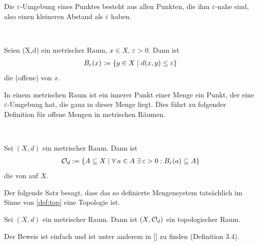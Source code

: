     Die
    $\varepsilon$-Umgebung eines Punktes besteht aus allen Punkten, die ihm $\varepsilon$-nahe sind, also einen kleineren Abstand als $\varepsilon$ haben.
    \begin{dfn}\label{def:eps-umg}\ \vspace{8pt}

        \noindent
        Seien (X,d) ein metrischer Raum, $x \in X$, $\varepsilon > 0$. Dann ist
        \begin{align*}
            B_\varepsilon(x) := \{y \in X \mid d(x,y) \leq \varepsilon \}
        \end{align*}
        die (offene)  von $x$.
        
    \end{dfn}


    In
    einem metrischen Raum ist ein innerer Punkt einer Menge ein Punkt, der eine $\varepsilon$-Umgebung hat, die ganz in dieser Menge liegt. Dies führt zu folgender Definition für offene Mengen in metrischen Räumen.
    \begin{dfn} \label{def:topMet} \ \vspace{8pt}

        \noindent
        Sei $(X,d)$ ein metrischer Raum. Dann ist
        \begin{align*}
            \mathcal{O}_d := \{A \subseteq X \mid \forall\: a \in A \; \exists\: \varepsilon > 0: B_\varepsilon(a) \subseteq A \}
        \end{align*}
        die von  auf $X$.
        
    \end{dfn}

    Der folgende Satz besagt, dass das so definierte Mengensystem tatsächlich im Sinne von \ref{def:top} eine Topologie ist.
    \begin{satz}
        Sei $(X,d)$ ein metrischer Raum. Dann ist $(X,\mathcal{O}_d)$ ein topologischer Raum.
    \end{satz}
    Der Beweis ist einfach und ist unter anderem in [\cite{manetti-m-2015--a}] zu finden (Definition 3.4).

